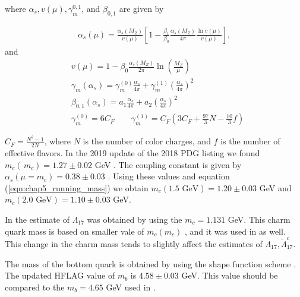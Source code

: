 where $\alpha_s, v(\mu), \gamma_m^{0,1}$, and $ \beta_{0,1}$ are given by

\begin{eqnarray}
\alpha_{s}(\mu)=\frac{\alpha_{s}\left(M_{Z}\right)}{v(\mu)}\left[1-\frac{\beta_{1}}{\beta_{0}} \frac{\alpha_{s}\left(M_{Z}\right)}{4 \pi} \frac{\ln v(\mu)}{v(\mu)}\right],
\end{eqnarray}
and 
\begin{align}
&v(\mu)=1-\beta_{0} \frac{\alpha_{s}\left(M_{Z}\right)}{2 \pi} \ln \left(\frac{M_{Z}}{\mu}\right)\nonumber\\
&\gamma_{m}\left(\alpha_{s}\right)=\gamma_{m}^{(0)} \frac{\alpha_{s}}{4 \pi}+\gamma_{m}^{(1)}\left(\frac{\alpha_{s}}{4 \pi}\right)^{2}\nonumber\\
&\beta_{0,1}\left(\alpha_{s}\right)=a_{1} \frac{\alpha_{s}}{4 \pi}+a_{2}\left(\frac{\alpha_{s}}{4 \pi}\right)^{2}\nonumber \\ 
&\gamma_{m}^{(0)}=6 C_{F} \qquad \gamma_{m}^{(1)}=C_{F}\left(3 C_{F}+\frac{97}{3} N-\frac{10}{3} f\right)
\end{align}

$C_{F}=\frac{N^{2}-1}{2 N}$, where $N$ is the number of color charges, and $f$ is the number of effective flavors. In the 2019 update of the 2018 PDG listing we found $m_c(\,m_c)=1.27\pm0.02$ GeV \cite{Tanabashi:2018oca}. The coupling constant is given by $\alpha_s(\mu=m_c) = 0.38 \pm0.03$ \cite{Tanabashi:2018oca}. Using these values and equation (\ref{eqn:chap5_running_mass}) we obtain $m_c(1.5 \mbox{ GeV})=1.20\pm0.03$ GeV and $m_c(2.0 \mbox{ GeV})=1.10\pm0.03$ GeV.\par
In \cite{Benzke:2010js} the estimate of $\Lambda_{17}$ was obtained by using the $m_c = 1.131$ GeV. This charm quark mass is based on smaller vale of $m_c(m_c)$ \cite{Hoang:2005zw}, and it was used in \cite{Misiak:2006zs,Misiak:2006ab} as well. This change in the charm mass tends to slightly affect the estimates of $\Lambda_{17}, \tilde{\Lambda}_{17}^c$.\par
The mass of the bottom quark is obtained by using the shape function scheme \cite{Benzke:2010js,Bosch:2004th}. The updated HFLAG \cite{Amhis:2016xyh} value of $m_b$ is $4.58\pm0.03$ GeV. This value should be compared to the $m_b = 4.65$ GeV used in \cite{Benzke:2010js}.
\vspace{-0.3cm}
